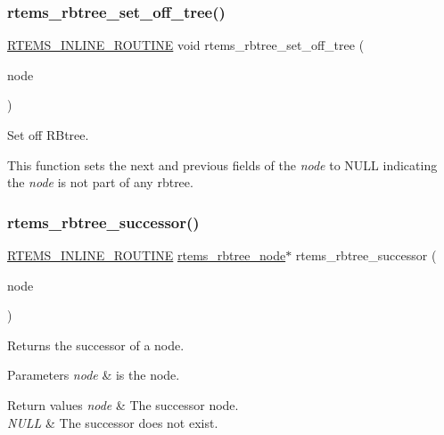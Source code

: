 \subsubsection{\texorpdfstring{rtems\_rbtree\_set\_off\_tree()}{rtems\_rbtree\_set\_off\_tree()}}
{\footnotesize\ttfamily \mbox{\hyperlink{group__RTEMSScoreBaseDefs_gac216239df231d5dbd15e3520b0b9313f}{R\+T\+E\+M\+S\+\_\+\+I\+N\+L\+I\+N\+E\+\_\+\+R\+O\+U\+T\+I\+NE}} void rtems\+\_\+rbtree\+\_\+set\+\_\+off\+\_\+tree (\begin{DoxyParamCaption}\item[{\mbox{\hyperlink{group__ClassicRBTrees_gaef47fc7fc61856c9afbf7f18a26ff80d}{rtems\+\_\+rbtree\+\_\+node}} $\ast$}]{node }\end{DoxyParamCaption})}



Set off R\+Btree. 

This function sets the next and previous fields of the {\itshape node} to N\+U\+LL indicating the {\itshape node} is not part of any rbtree. \mbox{\label{group__ClassicRBTrees_gae3989932de3de54f73f6e99878d39825}} 
\subsubsection{\texorpdfstring{rtems\_rbtree\_successor()}{rtems\_rbtree\_successor()}}
{\footnotesize\ttfamily \mbox{\hyperlink{group__RTEMSScoreBaseDefs_gac216239df231d5dbd15e3520b0b9313f}{R\+T\+E\+M\+S\+\_\+\+I\+N\+L\+I\+N\+E\+\_\+\+R\+O\+U\+T\+I\+NE}} \mbox{\hyperlink{group__ClassicRBTrees_gaef47fc7fc61856c9afbf7f18a26ff80d}{rtems\+\_\+rbtree\+\_\+node}}$\ast$ rtems\+\_\+rbtree\+\_\+successor (\begin{DoxyParamCaption}\item[{const \mbox{\hyperlink{group__ClassicRBTrees_gaef47fc7fc61856c9afbf7f18a26ff80d}{rtems\+\_\+rbtree\+\_\+node}} $\ast$}]{node }\end{DoxyParamCaption})}



Returns the successor of a node. 


\begin{DoxyParams}{Parameters}
{\em node} & is the node.\\
\hline
\end{DoxyParams}

\begin{DoxyRetVals}{Return values}
{\em node} & The successor node. \\
\hline
{\em N\+U\+LL} & The successor does not exist. \\
\hline
\end{DoxyRetVals}
